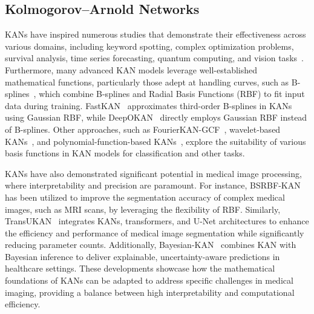 \subsection{Kolmogorov–Arnold Networks}
KANs have inspired numerous studies that demonstrate their effectiveness across various domains, including keyword spotting, complex optimization problems, survival analysis, time series forecasting, quantum computing, and vision tasks~\cite{li2024u,cheon2024demonstrating,ge2024tc}. Furthermore, many advanced KAN models leverage well-established mathematical functions, particularly those adept at handling curves, such as B-splines~\cite{ta2024bsrbf}, which combine B-splines and Radial Basis Functions (RBF) to fit input data during training. FastKAN~\cite{li2024kolmogorov} approximates third-order B-splines in KANs using Gaussian RBF, while DeepOKAN~\cite{abueidda2024deepokan} directly employs Gaussian RBF instead of B-splines. Other approaches, such as FourierKAN-GCF~\cite{xu2024fourierkan}, wavelet-based KANs~\cite{seydi2024unveiling}, and polynomial-function-based KANs~\cite{teymoor2024exploring}, explore the suitability of various basis functions in KAN models for classification and other tasks.

KANs have also demonstrated significant potential in medical image processing, where interpretability and precision are paramount. For instance, BSRBF-KAN~\cite{ta2024bsrbf} has been utilized to improve the segmentation accuracy of complex medical images, such as MRI scans, by leveraging the flexibility of RBF. Similarly, TransUKAN~\cite{wu2024transukan} integrates KANs, transformers, and U-Net architectures to enhance the efficiency and performance of medical image segmentation while significantly reducing parameter counts. Additionally, Bayesian-KAN~\cite{hassan2024bayesian} combines KAN with Bayesian inference to deliver explainable, uncertainty-aware predictions in healthcare settings. These developments showcase how the mathematical foundations of KANs can be adapted to address specific challenges in medical imaging, providing a balance between high interpretability and computational efficiency.
